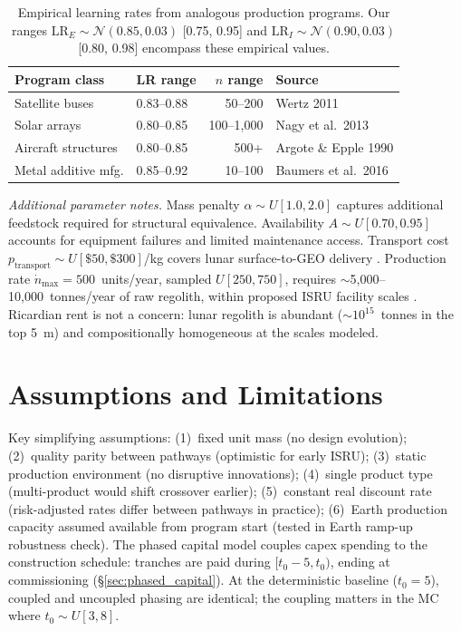 \documentclass[preprint,12pt]{elsarticle}
\begin{document}
\begin{table}[htbp]
\centering
\caption{Empirical learning rates from analogous production programs. Our ranges $\mathrm{LR}_E \sim \mathcal{N}(0.85, 0.03)$ [0.75, 0.95] and $\mathrm{LR}_I \sim \mathcal{N}(0.90, 0.03)$ [0.80, 0.98] encompass these empirical values.}
\label{tab:empirical_lr}
\small
\begin{tabular}{@{}llrl@{}}
\toprule
Program class & LR range & $n$ range & Source \\
\midrule
Satellite buses          & 0.83--0.88 & 50--200    & Wertz 2011 \cite{wertz2011} \\
Solar arrays             & 0.80--0.85 & 100--1{,}000 & Nagy et al.\ 2013 \cite{nagy2013} \\
Aircraft structures      & 0.80--0.85 & 500+       & Argote \& Epple 1990 \cite{argote1990} \\
Metal additive mfg.      & 0.85--0.92 & 10--100    & Baumers et al.\ 2016 \cite{baumers2016} \\
\bottomrule
\end{tabular}
\end{table}

\emph{Additional parameter notes.} Mass penalty $\alpha \sim U[1.0, 2.0]$ captures additional feedstock required for structural equivalence. Availability $A \sim U[0.70, 0.95]$ accounts for equipment failures and limited maintenance access. Transport cost $p_{\mathrm{transport}} \sim U[\$50, \$300]$/kg covers lunar surface-to-GEO delivery \cite{ishimatsu2016}. Production rate $\dot{n}_{\max} = 500$~units/year, sampled $U[250, 750]$, requires $\sim$5{,}000--10{,}000~tonnes/year of raw regolith, within proposed ISRU facility scales \cite{sanders2015}. Ricardian rent is not a concern: lunar regolith is abundant (${\sim}10^{15}$~tonnes in the top 5~m) and compositionally homogeneous at the scales modeled.

\section{Assumptions and Limitations}
\label{sec:appendix_assumptions}

Key simplifying assumptions: (1)~fixed unit mass (no design evolution); (2)~quality parity between pathways (optimistic for early ISRU); (3)~static production environment (no disruptive innovations); (4)~single product type (multi-product would shift crossover earlier); (5)~constant real discount rate (risk-adjusted rates differ between pathways in practice); (6)~Earth production capacity assumed available from program start (tested in Earth ramp-up robustness check). The phased capital model couples capex spending to the construction schedule: tranches are paid during $[t_0 - 5, t_0)$, ending at commissioning (\S\ref{sec:phased_capital}). At the deterministic baseline ($t_0 = 5$), coupled and uncoupled phasing are identical; the coupling matters in the MC where $t_0 \sim U[3,8]$.
\end{document}
